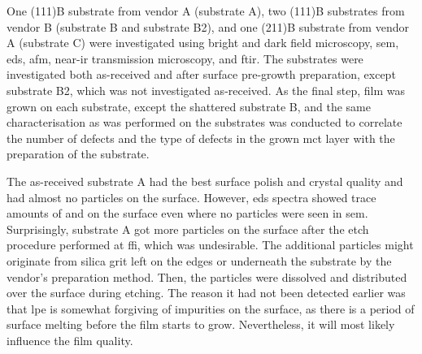 One (111)B substrate from vendor A (substrate A), two (111)B substrates from vendor B (substrate B and substrate B2), and one (211)B substrate from vendor A (substrate C) were investigated using bright and dark field microscopy, \ac{sem}, \ac{eds}, \ac{afm}, near-\ac{ir} transmission microscopy, and \ac{ftir}. The substrates were investigated both as-received and after surface pre-growth preparation, except substrate B2, which was not investigated as-received. As the final step,  film was grown on each substrate, except the shattered substrate B, and the same characterisation as was performed on the substrates was conducted to correlate the number of defects and the type of defects in the grown \ac{mct} layer with the preparation of the substrate.

The as-received substrate A had the best surface polish and crystal quality and had almost no particles on the surface. However, \ac{eds} spectra showed trace amounts of  and  on the surface even where no particles were seen in \ac{sem}. Surprisingly, substrate A got more particles on the surface after the etch procedure performed at \ac{ffi}, which was undesirable. The additional particles might originate from silica grit left on the edges or underneath the substrate by the vendor's preparation method. Then, the particles were dissolved and distributed over the surface during etching. The reason it had not been detected earlier was that \ac{lpe} is somewhat forgiving of impurities on the surface, as there is a period of surface melting before the film starts to grow. Nevertheless, it will most likely influence the film quality.

%

